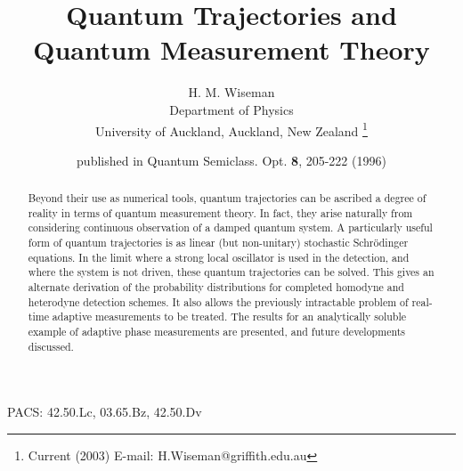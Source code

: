 \documentclass[12pt]{article}
\begin{document}
\title{Quantum Trajectories and Quantum Measurement Theory}  
\author{H. M. Wiseman  \\ Department of Physics\\ University of Auckland,
 Auckland, New Zealand \footnote{Current (2003) E-mail: H.Wiseman@griffith.edu.au}}
\date{published in Quantum Semiclass. Opt. {\bf 8}, 205-222 (1996)}
\maketitle


\newcommand{\beq}{\begin{equation}}
\newcommand{\eeq}{\end{equation}}
\newcommand{\bqa}{\begin{eqnarray}}
\newcommand{\eqa}{\end{eqnarray}}
\newcommand{\nn}{\nonumber}
\newcommand{\dg}{^\dagger}
\newcommand{\smallfrac}[2]{\mbox{$\frac{#1}{#2}$}}
\newcommand{\ket}[1]{| {#1} \rangle}
\newcommand{\bra}[1]{\langle {#1} |}
\newcommand{\sch}{Schr\"odinger }
\newcommand{\schs}{Schr\"odinger's }
\newcommand{\hei}{Heisenberg }
\newcommand{\heis}{Heisenberg's }
\newcommand{\half}{\smallfrac{1}{2}}
\newcommand{\bl}{{\bigl(}}
\newcommand{\br}{{\bigr)}}
\newcommand{\ito}{It\^o }
\newcommand{\str}{Stratonovich }
\newcommand{\bfi}{{\bf I}_{[0,t)}}


\begin{abstract}
Beyond their use as numerical tools, quantum trajectories can be ascribed a
degree of reality in terms of quantum measurement theory. In fact, they arise
naturally from considering continuous observation of a damped quantum system. A
particularly useful form of quantum trajectories is as linear (but non-unitary)
stochastic \sch equations. In the limit where a strong local oscillator is used
in the detection, and where the system is not driven, these quantum trajectories
can be solved. This gives an alternate derivation of the probability
distributions for completed homodyne and heterodyne detection schemes. It also
allows the previously intractable problem of real-time adaptive measurements to
be treated. The results for an analytically soluble example of adaptive phase
measurements are presented, and future developments discussed.


\end{abstract}

PACS: 42.50.Lc, 03.65.Bz, 42.50.Dv
\end{document}
